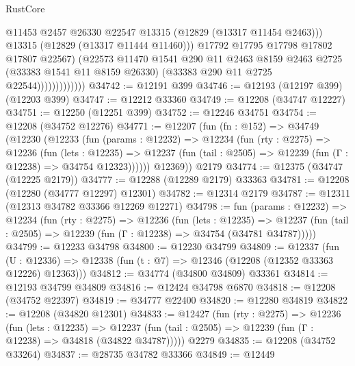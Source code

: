 \begin{lexlean}{RustCore}
\begin{coremodule}
                                @11453
                                @2457
                                @26330
                                @22547
                                @13315
                                (@12829 (@13317 @11454 @2463)))
                              @13315
                              (@12829 (@13317 @11444 @11460)))
                            @17792
                            @17795
                            @17798
                            @17802
                            @17807
                            @22567)
                          (@22573
                            @11470
                            @1541
                            @290
                            @11
                            @2463
                            @8159
                            @2463
                            @2725
                            (@33383 @1541 @11 @8159 @26330)
                            (@33383 @290 @11 @2725 @22544)))))))))))))
@34742 := @12191 @399
@34746 := @12193 (@12197 @399) (@12203 @399)
@34747 := @12212 @33360
@34749 := @12208 (@34747 @12227)
@34751 := @12250 (@12251 @399)
@34752 := @12246 @34751
@34754 := @12208 (@34752 @12276)
@34771 := @12207
    (fun (fn : @152) =>
    @34749
      (@12230
        (@12233
          (fun (params : @12232) =>
          @12234
            (fun (rty : @2275) =>
            @12236
              (fun (lets : @12235) =>
              @12237 (fun (tail : @2505) => @12239 (fun (Γ : @12238) => @34754 @12323))))))
        @12369))
    @2179
@34774 := @12375 (@34747 (@12225 @2179))
@34777 := @12288 (@12289 @2179) @33363
@34781 := @12208 (@12280 (@34777 @12297) @12301)
@34782 := @12314 @2179
@34787 := @12311 (@12313 @34782 @33366 @12269 @12271)
@34798 := fun (params : @12232) =>
  @12234
    (fun (rty : @2275) =>
    @12236
      (fun (lets : @12235) =>
      @12237 (fun (tail : @2505) => @12239 (fun (Γ : @12238) => @34754 (@34781 @34787)))))
@34799 := @12233 @34798
@34800 := @12230 @34799
@34809 := @12337
    (fun (U : @12336) => @12338 (fun (t : @7) => @12346 (@12208 (@12352 @33363 @12226) @12363)))
@34812 := @34774 (@34800 @34809) @33361
@34814 := @12193 @34799 @34809
@34816 := @12424 @34798 @6870
@34818 := @12208 (@34752 @22397)
@34819 := @34777 @22400
@34820 := @12280 @34819
@34822 := @12208 (@34820 @12301)
@34833 := @12427
    (fun (rty : @2275) =>
    @12236
      (fun (lets : @12235) =>
      @12237 (fun (tail : @2505) => @12239 (fun (Γ : @12238) => @34818 (@34822 @34787)))))
    @2279
@34835 := @12208 (@34752 @33264)
@34837 := @28735 @34782 @33366
@34849 := @12449

\end{coremodule}
\end{lexlean}
